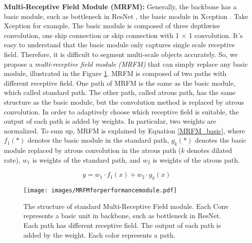 \documentclass[final]{cvpr}
\begin{document}
\textbf{Multi-Receptive Field Module (MRFM):} Generally, the backbone has a basic module, such as bottleneck in ResNet \cite{ResNet}, the basic module in Xception \cite{Xception}. Take Xception for example. The basic module is composed of three depthwise convolution, one skip connection or skip connection with 1 $\times$ 1 convolution. It's easy to understand that the basic module only captures single scale receptive field. Therefore, it is difficult to segment multi-scale objects accurately. So, we propose a \emph{multi-receptive field module (MRFM)} that can simply replace any basic module, illustrated in the Figure \ref{MRFMforperformancemodule}. MRFM is composed of two paths with different receptive field. One path of MRFM is the same as the basic module, which called standard path. The other path, called atrous path, has the same structure as the basic module, but the convolution method is replaced by atrous convolution. In order to adaptively choose which receptive field is suitable, the output of each path is added by weights. In particular, two weights are normalized. To sum up, MRFM is explained by Equation \ref{MRFM_basic}, where $f_{1}(*)$ denotes the basic module in the standard path, $g_{k}(*)$ denotes the basic module replaced by atrous convolution in the atrous path ($k$ denotes dilated rate), $w_{1}$ is weights of the standard path, and $w_{2}$ is weights of the atrous path.

\begin{equation}
y= w_{1} \cdot f_{1}(x) + w_{2} \cdot g_{k}(x)
\label{MRFM_basic}
\end{equation}


\begin{figure}[ht]
\centering
\texttt{[image: images/MRFMforperformancemodule.pdf]}
\caption{The structure of standard Multi-Receptive Field module. Each Conv represents a basic unit in backbone, such as bottleneck in ResNet. Each path has different receptive field. The output of each path is added by the weight. Each color represents a path.}
\label{MRFMforperformancemodule}
\end{figure}
\end{document}
